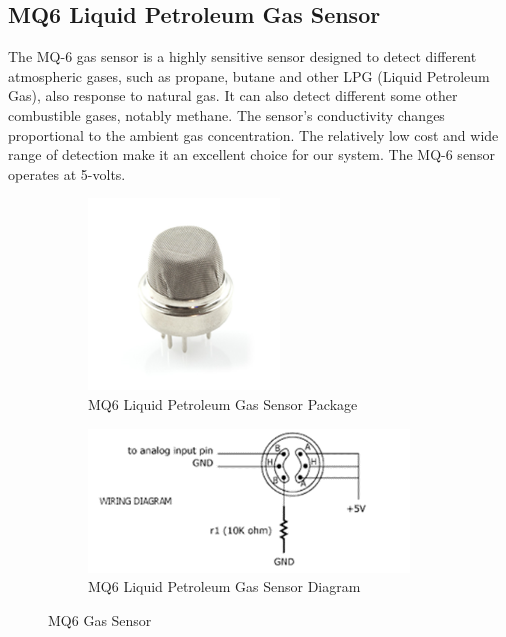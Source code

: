 \subsection{MQ6 Liquid Petroleum Gas Sensor}
\par The MQ-6 gas sensor is a highly sensitive sensor designed to detect different atmospheric gases, such as propane, butane and other LPG (Liquid Petroleum Gas), also response to natural gas. It can also detect different some other combustible gases, notably methane. The sensor's conductivity changes proportional to the ambient gas concentration. The relatively low cost and wide range of detection make it an excellent choice for our system. The MQ-6 sensor operates at 5-volts.
\begin{figure}[h!]
	\centering
	\begin{subfigure}[t]{0.45\textwidth}
		\centering
		\includegraphics[height = 2in]{mq6.png}
		\caption{MQ6 Liquid Petroleum Gas Sensor Package}
	\end{subfigure}
	\begin{subfigure}[t]{0.45\textwidth}
		\centering
		\includegraphics[height = 1.5in]{mq6diag.png}
		\caption{MQ6 Liquid Petroleum Gas Sensor Diagram}
	\end{subfigure}
	\caption{MQ6 Gas Sensor}
\end{figure}
